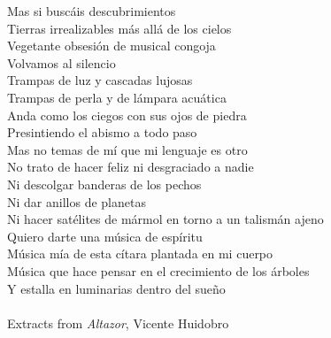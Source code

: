 \documentclass[english, hyphens]{umemoria}
\begin{document}

\begin{dedicatoria}


Mas si buscáis descubrimientos\\
Tierras irrealizables más allá de los cielos\\
Vegetante obsesión de musical congoja\\
Volvamos al silencio\\
Trampas de luz y cascadas lujosas\\
Trampas de perla y de lámpara acuática\\
Anda como los ciegos con sus ojos de piedra\\
Presintiendo el abismo a todo paso\\
Mas no temas de mí que mi lenguaje es otro\\
No trato de hacer feliz ni desgraciado a nadie\\
Ni descolgar banderas de los pechos\\
Ni dar anillos de planetas\\
Ni hacer satélites de mármol en torno a un talismán ajeno\\
Quiero darte una música de espíritu\\
Música mía de esta cítara plantada en mi cuerpo\\
Música que hace pensar en el crecimiento de los árboles\\
Y estalla en luminarias dentro del sueño\\
\textnormal{\\Extracts from \textit{Altazor}, Vicente Huidobro}
\end{dedicatoria}
\end{document}
